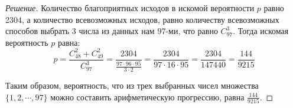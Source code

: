 \documentclass{article}
\begin{document}
\begin{proof}[Решение]
		Количество благоприятных исходов в искомой вероятности $p$ равно 2304, а количество всевозможных исходов, равно количеству всевозможных способов выбрать 3 числа из данных нам 97-ми, что равно $C_{97}^3$.
		Тогда искомая вероятность $p$ равна:
		$$p = \frac{C_{48}^2 + C_{49}^2}{C_{97}^3} = \frac{2304}{\frac{97 \cdot 96 \cdot 95}{3 \cdot 2}} = \frac{2304}{97 \cdot 16 \cdot 95} = \frac{2304}{147440} = \frac{144}{9215}$$
		
		Таким образом, вероятность, что из трех выбранных чисел множества $﻿\{1,2,\cdots,97\}﻿$ можно составить арифметическую прогрессию, равна $\frac{144}{9215}$.
\end{proof}

	
\end{document}
